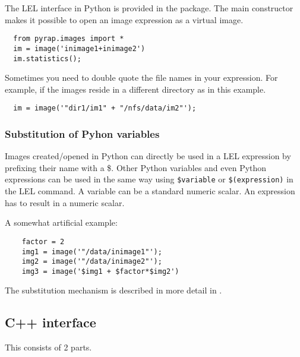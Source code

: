 The LEL interface in Python is provided in the
package. The main constructor makes it possible to open an image
expression as a virtual image.

\begin{verbatim}
  from pyrap.images import *
  im = image('inimage1+inimage2')
  im.statistics();
\end{verbatim}

\medskip Sometimes you need to double quote the file names in your expression.
For example, if the images reside in a different directory as in
this example.

\begin{verbatim}
  im = image('"dir1/im1" + "/nfs/data/im2"');
\end{verbatim}

\subsubsection {Substitution of Pyhon variables}

\medskip\noindent Images created/opened in Python can directly be used
in a LEL expression by prefixing their name with a \$. Other Python
variables and even Python expressions can be used in the same way
using  \texttt{\$variable} or \texttt{\$(expression)} in the LEL command.
A variable can be a standard numeric scalar.
An expression has to result in a numeric scalar.

\medskip
A somewhat artificial example:
\begin{verbatim}
    factor = 2
    img1 = image('"/data/inimage1"');
    img2 = image('"/data/inimage2"');
    img3 = image('$img1 + $factor*$img2')
\end{verbatim}

\medskip\noindent The substitution mechanism is described in more detail in
.

\subsection {C++ interface}
This consists of 2 parts.  

